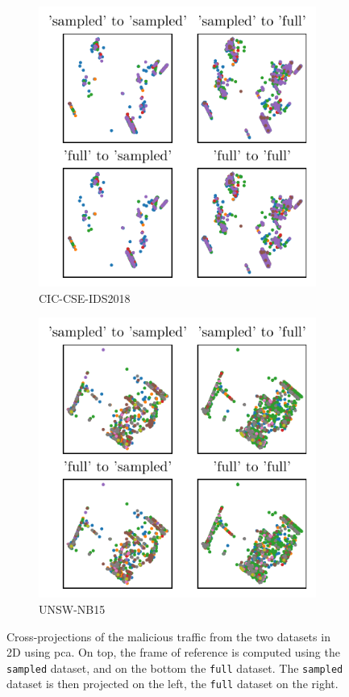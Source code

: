 \begin{figure}
  \begin{subfigure}{.45\linewidth}
    \centering
    \includegraphics{figures/cicids/pca-projection.pdf}
    \caption{CIC-CSE-IDS2018\label{fig:assess.pca.cicids}}
  \end{subfigure}
  \hfill
  \begin{subfigure}{.45\linewidth}
    \centering
    \includegraphics{figures/nb15/pca-projection.pdf}
    \caption{UNSW-NB15\label{fig:assess.pca.nb15}}
  \end{subfigure}
  \caption[
    Cross-projections of the malicious traffic from the two datasets in 2D using \gls{pca}.
  ]{
    Cross-projections of the malicious traffic from the two datasets in 2D using \gls{pca}.
    On top, the frame of reference is computed using the \texttt{sampled} dataset, and on the bottom the \texttt{full} dataset.
    The \texttt{sampled} dataset is then projected on the left, the \texttt{full} dataset on the right.
    }
  \label{fig:assess.pca}
\end{figure}

